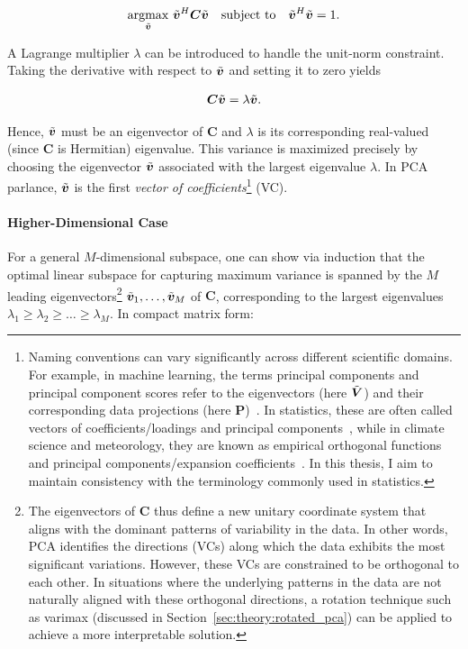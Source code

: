 \begin{align}\label{eq:theory:pca_maximization}
    \operatorname*{argmax}_{\tilde{\bm{v}}} \, \tilde{\bm{v}}^H\bm{C}\tilde{\bm{v}} \quad \text{subject to} \quad \tilde{\bm{v}}^H\tilde{\bm{v}} = 1.
\end{align}

A Lagrange multiplier $\lambda$ can be introduced to handle the unit-norm constraint. Taking the derivative with respect to $\tilde{\bm{v}}$ and setting it to zero yields 

\begin{equation}\label{eq:theory:pca_eigenproblem}
    \bm{C} \tilde{\bm{v}} = \lambda \tilde{\bm{v}}.
\end{equation}

Hence, $\tilde{\bm{v}}$ must be an eigenvector of $\bm{C}$ and $\lambda$ is its corresponding real-valued (since $\bm{C}$ is Hermitian) eigenvalue. This variance is maximized precisely by choosing the eigenvector $\tilde{\bm{v}}$ associated with the largest eigenvalue $\lambda$. In PCA parlance, $\tilde{\bm{v}}$ is the first \textit{vector of coefficients}\footnote{Naming conventions can vary significantly across different scientific domains. For example, in machine learning, the terms principal components and principal component scores refer to the eigenvectors (here $\tilde{\bm{V}}$) and their corresponding data projections (here $\bm{P}$)~\cite[e.g.][]{bishop_pattern_2006}. In statistics, these are often called vectors of coefficients/loadings and principal components~\cite[e.g.][]{jolliffe_principal_2002}, while in climate science and meteorology, they are known as empirical orthogonal functions and principal components/expansion coefficients~\cite[e.g.][]{storch_statistical_1999}. In this thesis, I aim to maintain consistency with the terminology commonly used in statistics.} (VC).

\paragraph{Higher-Dimensional Case} For a general $M$-dimensional subspace, one can show via induction that the optimal linear subspace for capturing maximum variance is spanned by the $M$ leading eigenvectors\footnote{The eigenvectors of $\bm{C}$ thus define a new unitary coordinate system that aligns with the dominant patterns of variability in the data. In other words, PCA identifies the directions (VCs) along which the data exhibits the most significant variations. However, these VCs are constrained to be orthogonal to each other. In situations where the underlying patterns in the data are not naturally aligned with these orthogonal directions, a rotation technique such as varimax (discussed in Section~\ref{sec:theory:rotated_pca}) can be applied to achieve a more interpretable solution.} $\tilde{\bm{v}}_1, \dots, \tilde{\bm{v}}_M$ of $\bm{C}$, corresponding to the largest eigenvalues $\lambda_1 \geq \lambda_2 \geq \dots \geq \lambda_M$. In compact matrix form:

